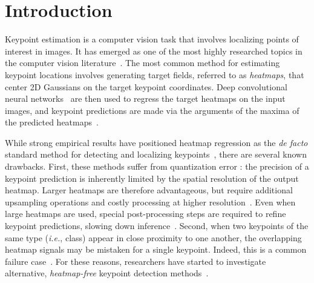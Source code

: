 \documentclass[runningheads]{llncs}
\newcommand{\ie}{\textit{i.e.}}
\newcommand\hlll[1]{\bgroup
  \hskip0pt\color{black}#1\egroup
}
\begin{document}
\section{Introduction}
Keypoint estimation is a computer vision task that involves localizing points of interest in images. It has emerged as one of the most highly researched topics in the computer vision literature~\cite{mcnally2021evopose2d, pavllo20193d, iqbal2018hand, huang2020awr, mcnally2018action, mcnally2019star, gavrilyuk2020actor, zhou2019objects, andriluka2018posetrack, raaj2019efficient, dong2018style, wang2019adaptive, xu2021anchorface, suwajanakorn2018discovery, jakab2018unsupervised, voeikov2020ttnet, mcnally2021deepdarts}. The most common method for estimating keypoint locations involves generating target fields, referred to as \textit{heatmaps}, \hlll{that center} 2D Gaussians on the target keypoint coordinates. Deep convolutional neural networks~\cite{lecun1995convolutional} are then used to regress the target heatmaps on the input images, and keypoint predictions are made via the arguments of the maxima of the predicted heatmaps~\cite{tompson2014joint}. 


While strong empirical results have positioned heatmap regression as the \textit{de facto} standard method for detecting and localizing keypoints~\cite{tompson2014joint, newell2016stacked, cao2017realtime, chen2018cascaded, xiao2018simple, sun2019deep, mcnally2021evopose2d, yang2021transpose, cheng2020higherhrnet, geng2021bottom, khirodkar2021multi, luo2021rethinking, braso2021center}, there are several known drawbacks. First, these methods suffer from quantization error\hlll{:} the precision of a keypoint prediction is inherently limited by the spatial resolution of the \hlll{output} heatmap. Larger heatmaps are therefore advantageous, but require additional upsampling operations and costly processing at higher resolution~\cite{mcnally2021evopose2d, cheng2020higherhrnet, geng2021bottom, luo2021rethinking, braso2021center}. Even when large heatmaps are used, special post-processing steps are required to refine keypoint predictions, \hlll{slowing} down inference~\cite{newell2016stacked, chen2018cascaded, cheng2020higherhrnet, luo2021rethinking}. Second, when two keypoints of the same type (\ie, class) appear in close proximity to one another, the overlapping heatmap signals may be mistaken for a single keypoint. Indeed, this is a common failure case~\cite{cao2017realtime}. For these reasons, researchers have started \hlll{to investigate} alternative, \textit{heatmap-free} keypoint detection methods~\cite{mcnally2021deepdarts, li20212d, li2021pose, li2021human, xu2021anchorface}.
\end{document}
